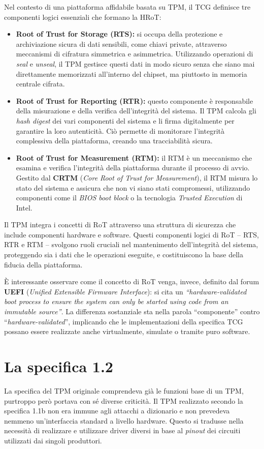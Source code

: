 Nel contesto di una piattaforma affidabile basata su TPM, il TCG definisce tre componenti logici essenziali che formano la HRoT:
\begin{itemize}
    \item \textbf{Root of Trust for Storage (RTS):} si occupa della protezione e archiviazione sicura di dati sensibili, come chiavi private, attraverso meccanismi di cifratura simmetrica e asimmetrica. Utilizzando operazioni di \textit{seal} e \textit{unseal}, il TPM gestisce questi dati in modo sicuro senza che siano mai direttamente memorizzati all'interno del chipset, ma piuttosto in memoria centrale cifrata.
    \item \textbf{Root of Trust for Reporting (RTR):} questo componente è responsabile della misurazione e della verifica dell'integrità del sistema. Il TPM calcola gli \textit{hash digest} dei vari componenti del sistema e li firma digitalmente per garantire la loro autenticità. Ciò permette di monitorare l’integrità complessiva della piattaforma, creando una tracciabilità sicura.
    \item \textbf{Root of Trust for Measurement (RTM):} il RTM è un meccanismo che esamina e verifica l'integrità della piattaforma durante il processo di avvio. Gestito dal \textbf{CRTM} (\textit{Core Root of Trust for Measurement}), il RTM misura lo stato del sistema e assicura che non vi siano stati compromessi, utilizzando componenti come il \textit{BIOS boot block} o la tecnologia \textit{Trusted Execution} di Intel.
\end{itemize}

Il TPM integra i concetti di RoT attraverso una struttura di sicurezza che include componenti hardware e software. Questi componenti logici di RoT -- RTS, RTR e RTM -- svolgono ruoli cruciali nel mantenimento dell'integrità del sistema, proteggendo sia i dati che le operazioni eseguite, e costituiscono la base della fiducia della piattaforma.

È interessante osservare come il concetto di RoT venga, invece, definito dal forum \textbf{UEFI} (\textit{Unified Extensible Firmware Interface}): si cita un \textit{“hardware-validated boot process to ensure the system can only be started using code from an immutable source”}. La differenza sostanziale sta nella parola “componente” contro “\textit{hardware-validated}”, implicando che le implementazioni della specifica TCG possano essere realizzate anche virtualmente, simulate o tramite puro software.

\clearpage
\section{La specifica 1.2}
La specifica del TPM originale comprendeva già le funzioni base di un TPM, purtroppo però portava con sé diverse criticità. Il TPM realizzato secondo la specifica 1.1b non era immune agli attacchi a dizionario e non prevedeva nemmeno un’interfaccia standard a livello hardware. Questo si tradusse nella necessità di realizzare e utilizzare driver diversi in base al \textit{pinout} dei circuiti utilizzati dai singoli produttori. 

